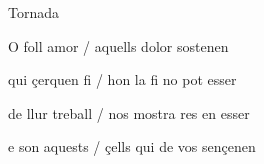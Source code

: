 \documentclass[12pt]{article}
\begin{document}
\begin{estrofaExtra}%




\begin{tornada}

Tornada

\end{tornada}


\end{estrofaExtra}


\begin{estrofa}

 O foll amor / aquells dolor sostenen

 qui \c{c}erquen fi / hon la fi no pot esser

 de llur treball / nos mostra res en esser

 e son aquests / \c{c}ells qui de vos sen\c{c}enen

\end{estrofa}
\end{document}
